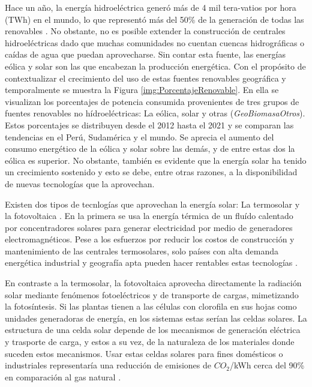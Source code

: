 Hace un año, la energía hidroeléctrica generó más de 4 mil tera-vatios por hora (TWh) en el mundo, lo que representó más del 50\% de la generación de todas las renovables \cite{irena2022international}. No obstante, no es posible extender la construcción de centrales hidroeléctricas dado que muchas comunidades no cuentan cuencas hidrográficas o caídas de agua que puedan aprovecharse. Sin contar esta fuente, las energías eólica y solar son las que encabezan la producción energética. Con el propósito de contextualizar el crecimiento del uso de estas fuentes renovables geográfica y temporalmente se muestra la Figura \ref{img:PorcentajeRenovable}. En ella se visualizan los porcentajes de potencia consumida provenientes de tres grupos de fuentes renovables no hídroeléctricas: La eólica, solar y otras (\textit{GeoBiomasaOtros}). Estos porcentajes se distribuyen desde el 2012 hasta el 2021 y se comparan las tendencias en el Perú, Sudamérica y el mundo. Se aprecia el aumento del consumo energético de la eólica y solar sobre las demás, y de entre estas dos la eólica es superior. No obstante, también es evidente que la energía solar ha tenido un crecimiento sostenido y esto se debe, entre otras razones, a la disponibilidad de nuevas tecnologías que la aprovechan.



Existen dos tipos de tecnlogías que aprovechan la energía solar: La termosolar y la fotovoltaica \cite{hammarstrom2012}. En la primera se usa la energía térmica de un fluído calentado por concentradores solares para generar electricidad por medio de generadores electromagnéticos. Pese a los esfuerzos por reducir los costos de construcción y mantenimiento de las centrales termosolares, solo países con alta demanda energética industrial y geografía apta pueden hacer rentables estas tecnologías \cite{xu2022concentrated}.



En contraste a la termosolar, la fotovoltaica aprovecha directamente la radiación solar mediante fenómenos fotoeléctricos y de transporte de cargas, mimetizando la fotosíntesis. Si las plantas tienen a las células con clorofila en sus hojas como unidades generadoras de energía, en los sistemas estas serían las celdas solares. La estructura de una celda solar depende de los mecanismos de generación eléctrica y trasporte de carga, y estos a su vez, de la naturaleza de los materiales donde suceden estos mecanismos. Usar estas celdas solares para fines domésticos o industriales representaría una reducción de emisiones de $CO_2$/kWh cerca del 90\% en comparación al gas natural \cite{tawalbeh2021environmental}.


